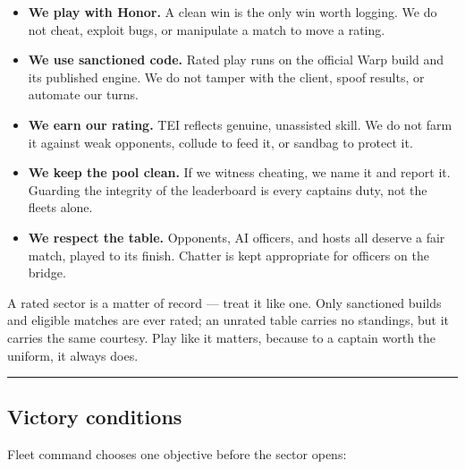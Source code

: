 \documentclass[11pt]{article}
\providecommand{\tightlist}{%
  \setlength{\itemsep}{0pt}\setlength{\parskip}{0pt}}
\begin{document}
\begin{itemize}
\tightlist
\item
  \textbf{We play with Honor.} A clean win is the only win worth
  logging. We do not cheat, exploit bugs, or manipulate a match to move
  a rating.
\item
  \textbf{We use sanctioned code.} Rated play runs on the official Warp
  build and its published engine. We do not tamper with the client,
  spoof results, or automate our turns.
\item
  \textbf{We earn our rating.} TEI reflects genuine, unassisted skill.
  We do not farm it against weak opponents, collude to feed it, or
  sandbag to protect it.
\item
  \textbf{We keep the pool clean.} If we witness cheating, we name it
  and report it. Guarding the integrity of the leaderboard is every
  captain\textquotesingle s duty, not the fleet\textquotesingle s alone.
\item
  \textbf{We respect the table.} Opponents, AI officers, and hosts all
  deserve a fair match, played to its finish. Chatter is kept
  appropriate for officers on the bridge.
\end{itemize}

A rated sector is a matter of record --- treat it like one. Only
sanctioned builds and eligible matches are ever rated; an unrated table
carries no standings, but it carries the same courtesy. Play like it
matters, because to a captain worth the uniform, it always does.

\begin{center}\rule{0.5\linewidth}{0.5pt}\end{center}

\subsection{Victory conditions}\label{victory-conditions}

Fleet command chooses one objective before the sector opens:
\end{document}
